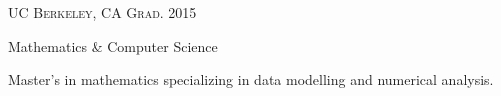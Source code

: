 \textsc{\small{UC Berkeley, CA
    \hfill
    {\raggedleft
        Grad. 2015
    }
}}

{\raggedright\large {
    Mathematics \& Computer Science
} \\}

\normalsize{
    Master's in mathematics specializing in data modelling and numerical analysis.
} \\
